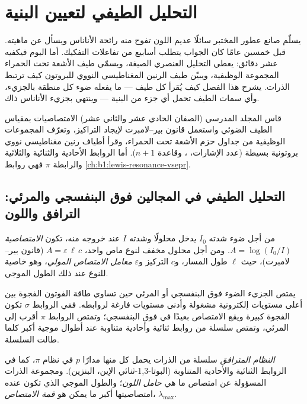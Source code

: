 \chapter{التحليل الطيفي لتعيين البنية}\label{ch:b1:structure-spectroscopy}

يسلّم صانع عطور المختبر سائلًا عديم اللون تفوح منه رائحة
الأناناس ويسأل عن ماهيته. قبل خمسين عامًا كان الجواب يتطلب
أسابيع من تفاعلات التفكيك. أما اليوم فيكفيه عشر دقائق: يعطي
التحليل العنصري الصيغة، ويسمّي طيف الأشعة تحت الحمراء
المجموعة الوظيفية، ويبيّن طيف الرنين المغناطيسي النووي للبروتون
كيف ترتبط الذرات. يشرح هذا الفصل كيف يُقرأ كل طيف
--- ما يفعله ضوء كل منطقة بالجزيء، وأي سمات الطيف
تحمل أي جزء من البنية --- وينتهي بجزيء
الأناناس ذاك.

\begin{recall}
قاس المجلد المدرسي (الصفان الحادي عشر والثاني عشر) الامتصاصيات بمقياس
الطيف الضوئي واستعمل قانون بير--لامبرت لإيجاد التراكيز،
وتعرّف المجموعات الوظيفية من جداول حزم الأشعة تحت الحمراء، وقرأ
أطياف رنين مغناطيسي نووي بروتونية بسيطة (عدد الإشارات، ، وقاعدة $n + 1$). أما الروابط الأحادية والثنائية والثلاثية والرابطة $\pi$ فهي روابط
\cref{ch:b1:lewis-resonance-vsepr}.
\end{recall}

\section{التحليل الطيفي في المجالين فوق البنفسجي والمرئي: الترافق واللون}

\begin{definition}\label{def:b1:structure-spectroscopy:absorbance}
من أجل ضوء شدته $I_0$ يدخل محلولًا وشدته $I$ عند خروجه منه، تكون
\emph{الامتصاصية} $A = \log(I_0/I)$. ومن أجل محلول
مخفف لنوع ماص واحد، $A = \varepsilon\,\ell\,c$ (قانون
بير--لامبرت)، حيث $\ell$ طول المسار، و$c$
التركيز و$\varepsilon$ \emph{معامل الامتصاص
المولي}، وهو خاصية
للنوع عند ذلك الطول الموجي.
\end{definition}

يمتص الجزيء الضوء فوق البنفسجي أو المرئي حين تساوي طاقة الفوتون
الفجوة بين أعلى مستويات إلكترونية مشغولة وأدنى مستويات فارغة
لروابطه. ففي الروابط $\sigma$ تكون الفجوة كبيرة ويقع
الامتصاص بعيدًا في فوق البنفسجي؛ وتمتص الروابط $\pi$ أقرب إلى
المرئي، وتمتص سلسلة من روابط ثنائية وأحادية متناوبة عند
أطوال موجية أكبر كلما طالت السلسلة.

\begin{definition}\label{def:b1:structure-spectroscopy:conjugation}
\emph{النظام المترافق} سلسلة من الذرات
يحمل كل منها مدارًا $p$ في نظام $\pi$، كما في الروابط الثنائية
والأحادية المتناوبة (البوتا-1,3-ثنائي الإين، البنزين). ومجموعة الذرات
المسؤولة عن امتصاص ما هي \emph{حامل اللون}؛
والطول الموجي الذي تكون عنده امتصاصيتها أكبر ما يمكن هو
\emph{قمة الامتصاص}، $\lambda_{\max}$.
\end{definition}

